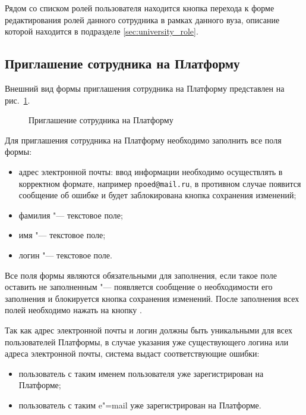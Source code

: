 Рядом со списком ролей пользователя находится кнопка перехода 
к форме редактирования ролей данного сотрудника в рамках данного вуза, 
описание которой находится в подразделе \ref{sec:university_role}.

\subsection{Приглашение сотрудника на Платформу}

Внешний вид формы приглашения сотрудника на Платформу представлен на рис.~\ref{img:employee:invite}. 

\begin{figure}[H]
	\caption{Приглашение сотрудника на Платформу}
	\label{img:employee:invite}
\end{figure}

Для приглашения сотрудника на Платформу необходимо заполнить все поля формы:
\begin{itemize}
	\item адрес электронной почты: ввод информации необходимо осуществлять в корректном формате, например 
	\texttt{npoed@mail.ru}, в противном случае появится сообщение об ошибке и будет заблокирована кнопка сохранения изменений;
	\item фамилия "--- текстовое поле;
	\item имя "--- текстовое поле;
	\item логин "--- текстовое поле.
\end{itemize}

Все поля формы являются обязательными для заполнения, если такое поле оставить не заполненным "--- появляется сообщение 
о необходимости его заполнения и блокируется кнопка сохранения изменений. 
После заполнения всех полей необходимо нажать на кнопку .

Так как адрес электронной почты и логин должны быть уникальными для всех пользователей Платформы, в случае указания
уже существующего логина или адреса электронной почты, система выдаст соответствующие ошибки:
\begin{itemize}
	\item пользователь с таким именем пользователя уже зарегистрирован на Платформе;
	\item пользователь с таким e"=mail уже зарегистрирован на Платформе.
\end{itemize}

